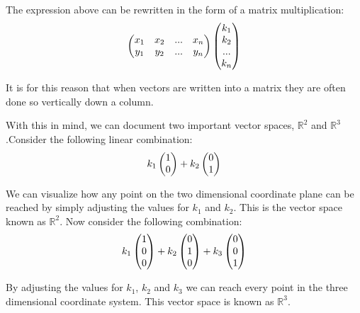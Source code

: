 \documentclass{article}
\begin{document}
\newline
\par \noindent The expression above can be rewritten in the form of a matrix multiplication:
\newline
\[
\left(\begin{array}{@{}cccc@{}}
	x_1 & x_2 & ... &x_n\\
	y_1 & y_2 & ... &y_n\\
	
\end{array}\right) 
\left(\begin{array}{@{}c@{}}
	k_1 \\
	k_2 \\
	... \\
	k_n
\end{array}\right) 
\]
\newline
\par \noindent It is for this reason that when vectors are written into a matrix they are often done so vertically down a column.
\newline
\par \noindent With this in mind, we can document two important vector spaces, \(\mathbb{R}^2\)  and \(\mathbb{R}^3\).Consider the following linear combination:
\newline
\[
k_1
\left(\begin{array}{@{}c@{}}
	1 \\
	0 \\
\end{array}\right) + 
k_2
\left(\begin{array}{@{}c@{}}
	0 \\
	1 \\
\end{array}\right)
\]
\newline
\par \noindent We can visualize how any point on the two dimensional coordinate plane can be reached by simply adjusting the values for \(k_1\) and \(k_2\). This is the vector space known as \( \mathbb{R}^2 \). Now consider the following combination:
\newline
\[
k_1
\left(\begin{array}{@{}c@{}}
	1 \\
	0 \\
	0 
\end{array}\right) + 
k_2
\left(\begin{array}{@{}c@{}}
	0 \\
	1 \\
	0
\end{array}\right) +
k_3
\left(\begin{array}{@{}c@{}}
	0 \\
	0 \\
	1
\end{array}\right)
\]
\newline
\par \noindent By adjusting the values for \(k_1\), \(k_2\) and \(k_3\) we can reach every point in the three dimensional coordinate system. This vector space is known as \(\mathbb{R}^3\).
\end{document}
